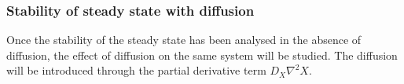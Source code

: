%
%
%
%
%
%
%
%
%


\subsubsection{Stability of steady state with diffusion}
Once the stability of the steady state has been analysed in the absence of diffusion, the effect of diffusion on the same system will be studied.
The diffusion will be introduced through the partial derivative term $D_{X}\nabla^2 X$.




%
%
%
%
%
%



